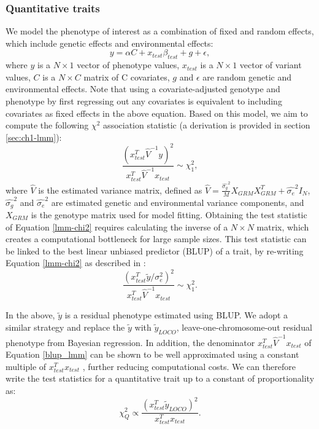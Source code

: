 \subsubsection{Quantitative traits} 
%
We model the phenotype of interest as a combination of fixed and random effects, which include genetic effects and environmental effects:
\begin{equation}
    y = \alpha C + x_{test}\beta_{test} + g + \epsilon, \label{eq:lin_lmm}
\end{equation}
where $y$ is a $N \times 1$ vector of phenotype values, $x_{test}$ is a $N \times 1$ vector of variant values, $C$ is a $N \times C$ matrix of C covariates, $g$ and $\epsilon$ are random genetic and environmental effects.
%
Note that using a covariate-adjusted genotype and phenotype by first regressing out any covariates is equivalent to including covariates as fixed effects in the above equation.
%
Based on this model, we aim to compute the following $\chi^2$ association statistic (a derivation is provided in section \ref{sec:ch1-lmm}): 
\begin{equation}
   \frac{(x_{test}^T \hat{V}^{-1} y)^2}{x_{test}^T \hat{V}^{-1} x_{test}} \sim \chi^2_1, \label{lmm-chi2}
\end{equation}
where $\hat{V}$ is the estimated variance matrix, defined as $\hat{V} = \frac{\hat{\sigma_g}^2}{M} X_{GRM}X_{GRM}^T + \hat{\sigma_e}^2 I_N$, $\hat{\sigma_g}^2$ and $\hat{\sigma_e}^2$ are estimated genetic and environmental variance components, and $X_{GRM}$ is the genotype matrix used for model fitting.
%
Obtaining the test statistic of Equation \ref{lmm-chi2} requires calculating the inverse of a $N \times N$ matrix, which creates a computational bottleneck for large sample sizes.
%
This test statistic can be linked to the best linear unbiased predictor (BLUP) of a trait, by re-writing Equation \ref{lmm-chi2} as described in \cite{loh2015efficient}:
\begin{equation}
    \frac{(x_{test}^T \tilde{y}/\sigma_e^2)^2}{x_{test}^T \hat{V}^{-1} x_{test}} \sim \chi^2_1.
    \label{blup_lmm}
\end{equation}

%
In the above, $\tilde{y}$ is a residual phenotype estimated using BLUP.
%
We adopt a similar strategy and replace the $\tilde{y}$ with $\tilde{y}_{LOCO}$, leave-one-chromosome-out residual phenotype from Bayesian regression.
%
In addition, the denominator $x_{test}^T \hat{V}^{-1} x_{test}$ of Equation \ref{blup_lmm} can be shown to be well approximated using a constant multiple of $x_{test}^T x_{test}$ \cite{svishcheva2012rapid}, further reducing computational costs.
%
We can therefore write the test statistics for a quantitative trait up to a constant of proportionality as:
\begin{equation}
    \chi^2_{Q} \propto \frac{(x_{test}^T \tilde{y}_{LOCO})^2}{x_{test}^T x_{test}}.
    \label{chisq_test_2}
\end{equation}

